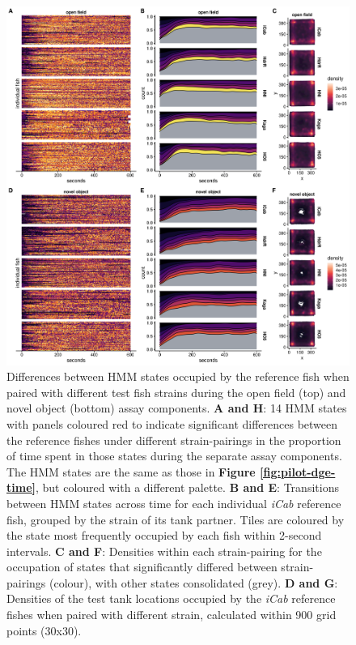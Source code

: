 \documentclass[
]{book}
\begin{document}
\begin{figure}
\includegraphics[width=0.78\linewidth]{figs/pilot/0.08_14_sge} \caption{Differences between HMM states occupied by the reference fish when paired with different test fish strains during the open field (top) and novel object (bottom) assay components. \textbf{A and H}: 14 HMM states with panels coloured red to indicate significant differences between the reference fishes under different strain-pairings in the proportion of time spent in those states during the separate assay components. The HMM states are the same as those in \textbf{Figure \ref{fig:pilot-dge-time}}, but coloured with a different palette. \textbf{B and E}: Transitions between HMM states across time for each individual \emph{iCab} reference fish, grouped by the strain of its tank partner. Tiles are coloured by the state most frequently occupied by each fish within 2-second intervals. \textbf{C and F}: Densities within each strain-pairing for the occupation of states that significantly differed between strain-pairings (colour), with other states consolidated (grey). \textbf{D and G}: Densities of the test tank locations occupied by the \emph{iCab} reference fishes when paired with different strain, calculated within 900 grid points (30x30).}\label{fig:pilot-sge-time}
\end{figure}
\end{document}
